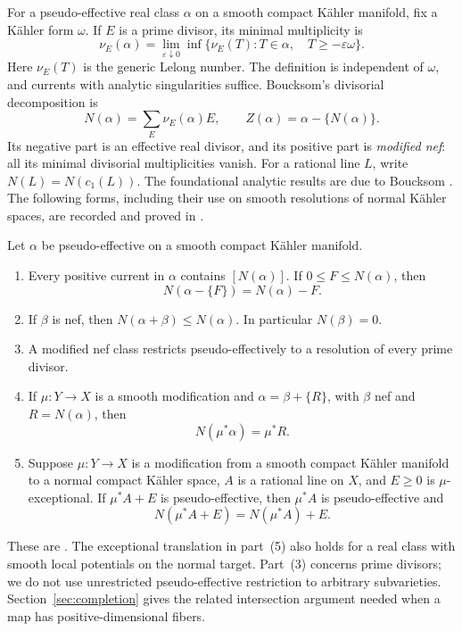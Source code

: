 For a pseudo-effective real class \(\alpha\) on a smooth compact
K\"ahler manifold, fix a K\"ahler form \(\omega\). If \(E\) is a prime
divisor, its minimal multiplicity is
\[
 \nu_E(\alpha)=\lim_{\varepsilon\downarrow0}
 \inf\{\nu_E(T):T\in\alpha,\quad T\geq-\varepsilon\omega\}.
\]
Here \(\nu_E(T)\) is the generic Lelong number. The definition is
independent of \(\omega\), and currents with analytic singularities
suffice. Boucksom's divisorial decomposition is
\[
 N(\alpha)=\sum_E\nu_E(\alpha)E,\qquad
 Z(\alpha)=\alpha-\{N(\alpha)\}.
\]
Its negative part is an effective real divisor, and its positive part
is \emph{modified nef}: all its minimal divisorial multiplicities vanish.
For a rational line \(L\), write \(N(L)=N(c_1(L))\).
The foundational analytic results are due to Boucksom
\cite[Sections~2--3 and~5]{Boucksom2004}. The following forms, including
their use on smooth resolutions of normal K\"ahler spaces, are recorded
and proved in \cite[Section~2]{K}.

\begin{lemma}\label{pre:negative}
Let \(\alpha\) be pseudo-effective on a smooth compact K\"ahler manifold.
\begin{enumerate}
\item Every positive current in \(\alpha\) contains
\([N(\alpha)]\). If \(0\leq F\leq N(\alpha)\), then
\[
 N(\alpha-\{F\})=N(\alpha)-F.
\]
\item If \(\beta\) is nef, then \(N(\alpha+\beta)\leq N(\alpha)\).
In particular \(N(\beta)=0\).
\item A modified nef class restricts pseudo-effectively to a resolution
of every prime divisor.
\item If \(\mu:Y\to X\) is a smooth modification and
\(\alpha=\beta+\{R\}\), with \(\beta\) nef and \(R=N(\alpha)\), then
\[
 N(\mu^*\alpha)=\mu^*R.
\]
\item Suppose \(\mu:Y\to X\) is a modification from a smooth compact
K\"ahler manifold to a normal compact K\"ahler space, \(A\) is a rational
line on \(X\), and \(E\geq0\) is \(\mu\)-exceptional. If
\(\mu^*A+E\) is pseudo-effective, then \(\mu^*A\) is pseudo-effective and
\[
 N(\mu^*A+E)=N(\mu^*A)+E.
\]
\end{enumerate}
\end{lemma}

These are \cite[Lemmas~2.2--2.4]{K}. The exceptional translation in
part~(5) also holds for a real class with smooth local potentials on
the normal target. Part~(3) concerns prime divisors; we do not use
unrestricted pseudo-effective restriction to arbitrary subvarieties.
Section~\ref{sec:completion} gives the related intersection argument
needed when a map has positive-dimensional fibers.

